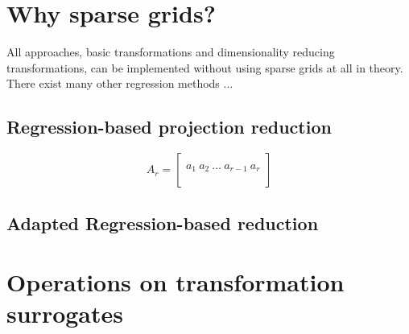 \documentclass[
  a4paper,  %
  twoside,  %
  bibliography=totoc,
  headsepline,
  cleardoublepage=empty,
  parskip=half,
  draft=false
]{scrbook}
\begin{document}
\section{Why sparse grids?}

All approaches, basic transformations and dimensionality reducing transformations, can be implemented without using sparse grids at all in theory.
There exist many other regression methods ...



\subsection{Regression-based projection reduction}

\begin{equation}
A_r=\begin{bmatrix}
  \\
    a_1 ~ a_2 ~ \dots ~ a_{r-1} ~ a_r\\
    \\
  \end{bmatrix}
\label{basis}
\end{equation}


\subsection{Adapted Regression-based reduction}

\section{Operations on transformation surrogates}
\end{document}
